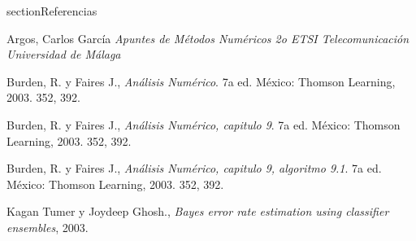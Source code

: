 section{Referencias}

\begin{thebibliography}{5}
     Argos, Carlos García \emph{Apuntes de Métodos Numéricos 2o ETSI Telecomunicación Universidad de Málaga}

     Burden, R. y Faires J., \emph{Análisis
    Numérico}. 7a ed. México: Thomson Learning, 2003. 352, 392.

     Burden, R. y Faires J., \emph{Análisis
    Numérico, capitulo 9}. 7a ed. México: Thomson Learning, 2003. 352, 392.
    
     Burden, R. y Faires J., \emph{Análisis
    Numérico, capitulo 9, algoritmo 9.1}. 7a ed. México: Thomson Learning, 2003. 352, 392.
        
     Kagan Tumer y Joydeep Ghosh.,  \emph{Bayes error rate estimation using classifier ensembles}, 2003.

\end{thebibliography}


